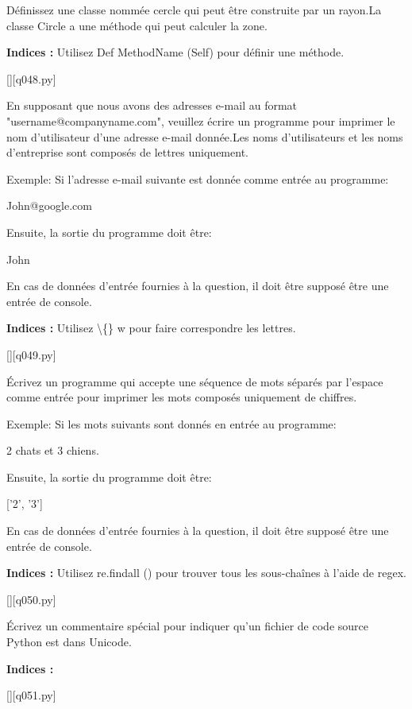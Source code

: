 \question
Définissez une classe nommée cercle qui peut être construite par un rayon.La classe Circle a une méthode qui peut calculer la zone.
\par
\textbf{Indices : }Utilisez Def MethodName (Self) pour définir une méthode.
\renewcommand{\nomfichier}{q048.py}
\begin{solution}
    \pythonfile{\chemincode \nomfichier}[][q048.py]
\end{solution}


\question
En supposant que nous avons des adresses e-mail au format "username@companyname.com", veuillez écrire un programme pour imprimer le nom d'utilisateur d'une adresse e-mail donnée.Les noms d'utilisateurs et les noms d'entreprise sont composés de lettres uniquement.

Exemple:
Si l'adresse e-mail suivante est donnée comme entrée au programme:

John@google.com

Ensuite, la sortie du programme doit être:

John

En cas de données d'entrée fournies à la question, il doit être supposé être une entrée de console.
\par
\textbf{Indices : }Utilisez \textbackslash\{\} w pour faire correspondre les lettres.
\renewcommand{\nomfichier}{q049.py}
\begin{solution}
    \pythonfile{\chemincode \nomfichier}[][q049.py]
\end{solution}


\question
Écrivez un programme qui accepte une séquence de mots séparés par l'espace comme entrée pour imprimer les mots composés uniquement de chiffres.

Exemple:
Si les mots suivants sont donnés en entrée au programme:

2 chats et 3 chiens.

Ensuite, la sortie du programme doit être:

['2', '3']

En cas de données d'entrée fournies à la question, il doit être supposé être une entrée de console.
\par
\textbf{Indices : }Utilisez re.findall () pour trouver tous les sous-chaînes à l'aide de regex.
\renewcommand{\nomfichier}{q050.py}
\begin{solution}
    \pythonfile{\chemincode \nomfichier}[][q050.py]
\end{solution}


\question
Écrivez un commentaire spécial pour indiquer qu'un fichier de code source Python est dans Unicode.
\par
\textbf{Indices : }
\renewcommand{\nomfichier}{q051.py}
\begin{solution}
    \pythonfile{\chemincode \nomfichier}[][q051.py]
\end{solution}



